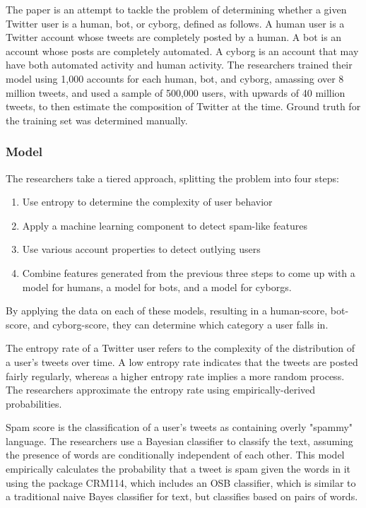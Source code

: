 \documentclass[11pt, oneside]{article}   	%
\begin{document}
\quad The paper is an attempt to tackle the problem of determining whether a given Twitter user is a human, bot, or cyborg, defined as follows.
A human user is a Twitter account whose tweets are completely posted by a human.
A bot is an account whose posts are completely automated.
A cyborg is an account that may have both automated activity and human activity.
The researchers trained their model using 1,000 accounts for each human, bot, and cyborg, amassing over 8 million tweets, and used a sample of 500,000 users, with upwards of 40 million tweets, to then estimate the composition of Twitter at the time.
Ground truth for the training set was determined manually.

\subsubsection*{Model}

\quad The researchers take a tiered approach, splitting the problem into four steps:
\begin{enumerate}
	\item Use entropy to determine the complexity of user behavior
	\item Apply a machine learning component to detect spam-like features
	\item Use various account properties to detect outlying users
	\item Combine features generated from the previous three steps to come up with a model for humans, a model for bots, and a model for cyborgs. 
\end{enumerate}	
By applying the data on each of these models, resulting in a human-score, bot-score, and cyborg-score, they can determine which category a user falls in.

\quad The entropy rate of a Twitter user refers to the complexity of the distribution of a user's tweets over time.
A low entropy rate indicates that the tweets are posted fairly regularly, whereas a higher entropy rate implies a more random process.
The researchers approximate the entropy rate using empirically-derived probabilities.

\quad Spam score is the classification of a user's tweets as containing overly "spammy" language.
The researchers use a Bayesian classifier to classify the text, assuming the presence of words are conditionally independent of each other.
This model empirically calculates the probability that a tweet is spam given the words in it using the package CRM114, which includes an OSB classifier, which is similar to a traditional naive Bayes classifier for text, but classifies based on pairs of words.
\end{document}
